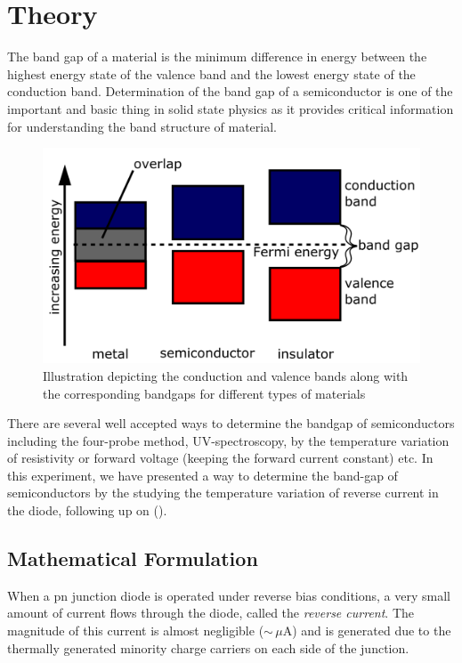 \section{Theory}
The band gap of a material is the minimum difference in energy between the highest energy state of the valence band and the lowest energy state of the conduction band. Determination of the band gap of a semiconductor is one of the important and basic thing in solid state physics as it provides critical information for understanding the band structure of material.

\begin{figure}[h]
    \centering
    \includegraphics[width=1\columnwidth]{images/th1.png}
    \caption{Illustration depicting the conduction and valence bands along with the corresponding bandgaps for different types of materials}
    \label{f1}
\end{figure}

There are several well accepted ways to determine the bandgap of semiconductors including the four-probe method, UV-spectroscopy, by the temperature variation of resistivity or forward voltage (keeping the forward current constant) etc. In this experiment, we have presented a way to determine the band-gap of semiconductors by the studying the temperature variation of reverse current in the diode, following up on \citeauthor{biswas-2022} (\citeyear{biswas-2022}). 

\subsection{Mathematical Formulation}
When a pn junction diode is operated under reverse bias conditions, a very small amount of current flows through the diode, called the \textit{reverse current}. The magnitude of this current is almost negligible ($\sim\,\mu$A) and is generated due to the thermally generated minority charge carriers on each side of the junction. 

